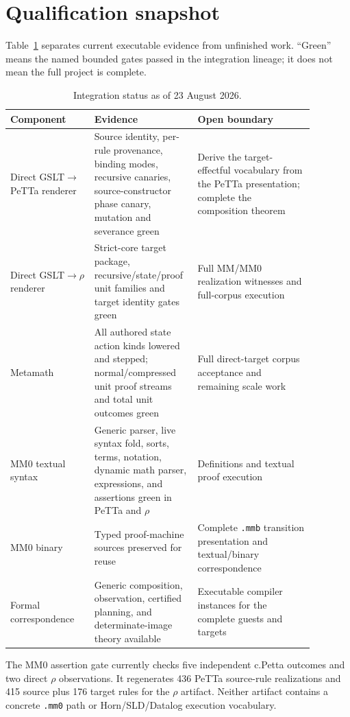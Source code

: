 \documentclass[11pt]{article}
\theoremstyle{remark}
\newcommand{\code}[1]{\texttt{#1}}
\begin{document}
\section{Qualification snapshot}

Table~\ref{tab:status} separates current executable evidence from unfinished
work.  ``Green'' means the named bounded gates passed in the integration
lineage; it does not mean the full project is complete.

\begin{table}[htbp]
\centering
\small
\begin{tabular}{>{\raggedright\arraybackslash}p{0.26\linewidth}
                >{\raggedright\arraybackslash}p{0.26\linewidth}
                >{\raggedright\arraybackslash}p{0.36\linewidth}}
\toprule
Component & Evidence & Open boundary \\
\midrule
Direct GSLT$\to$PeTTa renderer &
Source identity, per-rule provenance, binding modes, recursive canaries,
source-constructor phase canary, mutation and severance green &
Derive the target-effectful vocabulary from the PeTTa presentation; complete
the composition theorem \\
Direct GSLT$\to\rho$ renderer &
Strict-core target package, recursive/state/proof unit families and target
identity gates green &
Full MM/MM0 realization witnesses and full-corpus execution \\
Metamath &
All authored state action kinds lowered and stepped; normal/compressed unit
proof streams and total unit outcomes green &
Full direct-target corpus acceptance and remaining scale work \\
MM0 textual syntax &
Generic parser, live syntax fold, sorts, terms, notation, dynamic math parser,
expressions, and assertions green in PeTTa and $\rho$ &
Definitions and textual proof execution \\
MM0 binary &
Typed proof-machine sources preserved for reuse &
Complete \code{.mmb} transition presentation and textual/binary
correspondence \\
Formal correspondence &
Generic composition, observation, certified planning, and determinate-image
theory available &
Executable compiler instances for the complete guests and targets \\
\bottomrule
\end{tabular}
\caption{Integration status as of 23 August 2026.}
\label{tab:status}
\end{table}

The MM0 assertion gate currently checks five independent c.Petta outcomes and
two direct $\rho$ observations.  It regenerates 436 PeTTa source-rule
realizations and 415 source plus 176 target rules for the $\rho$ artifact.
Neither artifact contains a concrete \code{.mm0} path or Horn/SLD/Datalog
execution vocabulary.
\end{document}
